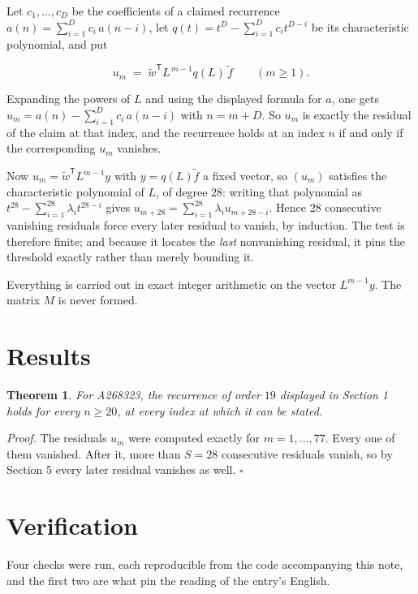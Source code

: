 \documentclass[11pt]{article}
\newtheorem{theorem}{Theorem}
\theoremstyle{definition}
\begin{document}
Let $c_1,\dots,c_D$ be the coefficients of a claimed recurrence $a(n) = \sum_{i=1}^{D} c_i\,a(n-i)$, let $q(t) = t^{D} - \sum_{i=1}^{D} c_i t^{D-i}$ be its characteristic polynomial, and put

\[u_m \;=\; \tilde w^{\mathsf T} L^{\,m-1} q(L)\,\tilde f \qquad (m \ge 1).\]

Expanding the powers of $L$ and using the displayed formula for $a$, one gets $u_m = a(n) - \sum_{i=1}^{D} c_i\,a(n-i)$ with $n = m + D$. So $u_m$ is exactly the residual of the claim at that index, and the recurrence holds at an index $n$ if and only if the corresponding $u_m$ vanishes.

Now $u_m = \tilde w^{\mathsf T} L^{m-1} y$ with $y = q(L)\tilde f$ a fixed vector, so $(u_m)$ satisfies the characteristic polynomial of $L$, of degree $28$: writing that polynomial as $t^{28} - \sum_{i=1}^{28} \lambda_i t^{28-i}$ gives $u_{m+28} = \sum_{i=1}^{28} \lambda_i u_{m+28-i}$. Hence $28$ consecutive vanishing residuals force every later residual to vanish, by induction. The test is therefore finite; and because it locates the {\itshape last} nonvanishing residual, it pins the threshold exactly rather than merely bounding it.

Everything is carried out in exact integer arithmetic on the vector $L^{m-1}y$. The matrix $M$ is never formed.

\section{Results}

\begin{theorem} For A268323, the recurrence of order $19$ displayed in Section 1 holds for every $n \ge 20$, at every index at which it can be stated.\end{theorem}

{\itshape Proof.} The residuals $u_m$ were computed exactly for $m = 1,\dots,77$. Every one of them vanished. After it, more than $S = 28$ consecutive residuals vanish, so by Section 5 every later residual vanishes as well. $\square$

\section{Verification}

Four checks were run, each reproducible from the code accompanying this note, and the first two are what pin the reading of the entry's English.
\end{document}
